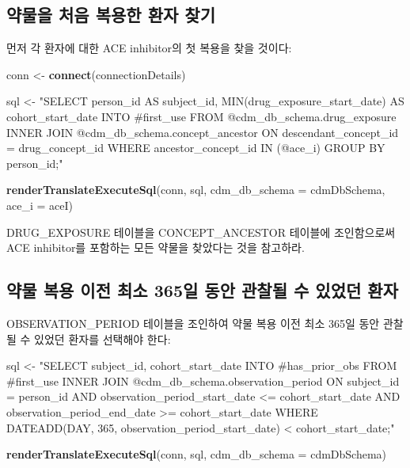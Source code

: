 \documentclass[11pt]{book}
\newenvironment{Shaded}{\begin{snugshade}}{\end{snugshade}}
\newcommand{\KeywordTok}[1]{\textcolor[rgb]{0.13,0.29,0.53}{\textbf{#1}}}
\newcommand{\DataTypeTok}[1]{\textcolor[rgb]{0.13,0.29,0.53}{#1}}
\newcommand{\StringTok}[1]{\textcolor[rgb]{0.31,0.60,0.02}{#1}}
\newcommand{\NormalTok}[1]{#1}
\theoremstyle{definition}
\theoremstyle{definition}
\theoremstyle{definition}
\theoremstyle{remark}
\begin{document}
\subsection{약물을 처음 복용한 환자 찾기}\label{----}

먼저 각 환자에 대한 ACE inhibitor의 첫 복용을 찾을 것이다:

\begin{Shaded}
\begin{Highlighting}[]
\NormalTok{conn <-}\StringTok{ }\KeywordTok{connect}\NormalTok{(connectionDetails)}

\NormalTok{sql <-}\StringTok{ "SELECT person_id AS subject_id,}
\StringTok{  MIN(drug_exposure_start_date) AS cohort_start_date}
\StringTok{INTO #first_use}
\StringTok{FROM @cdm_db_schema.drug_exposure}
\StringTok{INNER JOIN @cdm_db_schema.concept_ancestor}
\StringTok{  ON descendant_concept_id = drug_concept_id}
\StringTok{WHERE ancestor_concept_id IN (@ace_i)}
\StringTok{GROUP BY person_id;"}

\KeywordTok{renderTranslateExecuteSql}\NormalTok{(conn,}
\NormalTok{                          sql,}
                          \DataTypeTok{cdm_db_schema =}\NormalTok{ cdmDbSchema,}
                          \DataTypeTok{ace_i =}\NormalTok{ aceI)}
\end{Highlighting}
\end{Shaded}

DRUG\_EXPOSURE 테이블을 CONCEPT\_ANCESTOR 테이블에 조인함으로써 ACE
inhibitor를 포함하는 모든 약물을 찾았다는 것을 참고하라.

\subsection{약물 복용 이전 최소 365일 동안 관찰될 수 있었던
환자}\label{----365-----}

OBSERVATION\_PERIOD 테이블을 조인하여 약물 복용 이전 최소 365일 동안
관찰될 수 있었던 환자를 선택해야 한다:

\begin{Shaded}
\begin{Highlighting}[]
\NormalTok{sql <-}\StringTok{ "SELECT subject_id,}
\StringTok{  cohort_start_date}
\StringTok{INTO #has_prior_obs}
\StringTok{FROM #first_use}
\StringTok{INNER JOIN @cdm_db_schema.observation_period}
\StringTok{  ON subject_id = person_id}
\StringTok{    AND observation_period_start_date <= cohort_start_date}
\StringTok{    AND observation_period_end_date >= cohort_start_date}
\StringTok{WHERE DATEADD(DAY, 365, observation_period_start_date) < cohort_start_date;"}

\KeywordTok{renderTranslateExecuteSql}\NormalTok{(conn, sql, }\DataTypeTok{cdm_db_schema =}\NormalTok{ cdmDbSchema)}
\end{Highlighting}
\end{Shaded}
\end{document}
